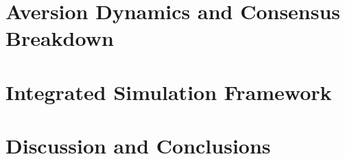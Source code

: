 \documentclass[12pt,a4paper]{book}
\begin{document}
\chapter{Aversion Dynamics and Consensus Breakdown}
% 

\chapter{Integrated Simulation Framework}
% 

\chapter{Discussion and Conclusions}
% 

\backmatter

\printbibliography[heading=bibintoc,title={References}]
\end{document}
